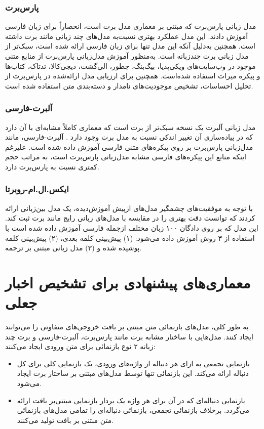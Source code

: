 \subsubsection{پارس‌برت}
	\cite{ParsBERT}
	مدل زبانی پارس‌برت که مبتنی بر معماری مدل برت است، انحصاراً برای زبان فارسی آموزش دادند. این مدل عملکرد بهتری نسبت‌به مدل‌های چند زبانی مانند برت داشته ‌است. همچنین به‌دلیل آنکه این مدل تنها برای زبان فارسی ارائه شده‌ است، سبک‌تر از مدل زبانی برت چندزبانه است. به‌منظور آموزش مدل‌زبانی پارس‌برت از منابع متنی موجود در وب‌سایت‌های ویکی‌پدیا، بیگ‌بنگ، چطور، الی‌گشت، دیجی‌کالا، تد‌تاک، کتاب‌ها و پیکره میراث استفاده شده‌است. همچنین برای ارزیابی مدل‌ ارائه‌شده در پارس‌برت از تحلیل احساسات، تشخیص موجودیت‌های نامدار و دسته‌بندی متن استفاده شده ‌است.
	
\subsubsection{آلبرت-فارسی}
	مدل‌ زبانی آلبرت یک نسخه سبک‌تر از برت است که معماری کاملاً مشابه‌ای با آن دارد که در پیاده‌سازی آن تغییر اندکی نسبت ‌به مدل برت وجود دارد \citep{ALBERTPersian}. آلبرت-فارسی، مانند مدل‌زبانی پارس‌برت بر روی  پیکره‌های متنی فارسی آموزش داده شده‌ است. علیرغم اینکه منابع این پیکره‌های فارسی مشابه مدل‌زبانی پارس‌برت است، به ‌مراتب حجم  کمتری نسبت ‌به پارس‌برت دارد.
	
\subsubsection{ایکس.ال.ام-روبرتا}
	با توجه به موفقیت‌های چشمگیر مدل‌های ازپیش آموزش‌دیده، \cite{conneau2019unsupervised} یک مدل‌ بین‌زبانی ارائه کردند که توانست دقت بهتری را در مقایسه با مدل‌های زبانی رایج مانند برت ثبت کند. این مدل که بر روی دادگان ۱۰۰ زبان مختلف ازجمله فارسی آموزش داده شده‌ است  با استفاده از ۳ روش آموزش داده می‌شود: (۱) پیش‌بینی کلمه بعدی، (۲) پیش‌بینی کلمه پوشیده شده و (۳) مدل زبانی مبتنی بر ترجمه.

\section{معماری‌های پیشنهادی برای تشخیص اخبار جعلی}
به طور کلی، مدل‌های بازنمائی متن مبتنی بر بافت خروجی‌های متفاوتی را می‌توانند ایجاد کنند. مدل‌هایی با ساختار مشابه برت مانند پارس‌برت، آلبرت-فارسی و برت چند زبانه ۲ نوع بازنمائی برای متن ورودی ایجاد می‌کنند:
\begin{itemize}
\item بازنمایی تجمعی به ازای هر دنباله از واژه‌های ورودی، یک بازنمایی کلی برای کل دنباله ارائه می‌کند.
این بازنمائی تنها توسط مدل‌های مبتنی بر ساختار برت ایجاد می‌شود.
\item بازنمایی دنباله‌ای که در آن برای هر واژه یک بردار بازنمایی مبتنی‌بر بافت ارائه
 می‌گردد. برخلاف بازنمائی تجمعی، بازنمائی دنباله‌ای را تمامی مدل‌های بازنمائی متن مبتنی بر بافت تولید می‌کنند.
\end{itemize}

